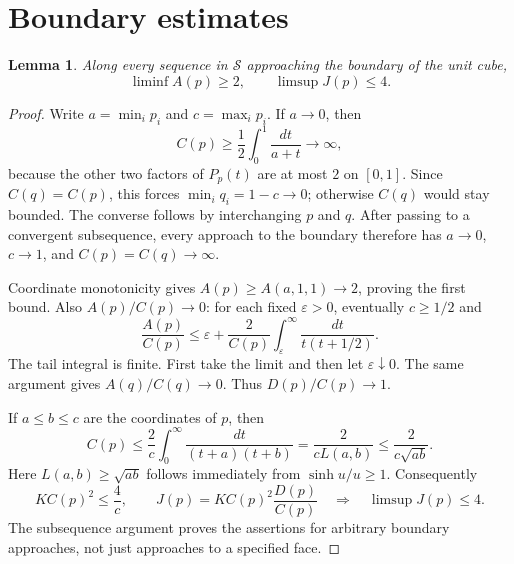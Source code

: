 \documentclass[11pt]{article}
\newtheorem{lemma}{Lemma}
\begin{document}
\section{Boundary estimates}
\begin{lemma}\label{boundary}
Along every sequence in $\mathcal S$ approaching the boundary of the unit cube,
\[
 \liminf A(p)\geq2,\qquad \limsup J(p)\leq4.
\]
\end{lemma}
\begin{proof}
Write $a=\min_i p_i$ and $c=\max_i p_i$. If $a\to0$, then
\[
 C(p)\geq\frac12\int_0^1\frac{dt}{a+t}\longrightarrow\infty,
\]
because the other two factors of $P_p(t)$ are at most $2$ on $[0,1]$.
Since $C(q)=C(p)$, this forces $\min_i q_i=1-c\to0$; otherwise $C(q)$
would stay bounded. The converse follows by interchanging $p$ and $q$.
After passing to a convergent subsequence, every approach to the boundary
therefore has $a\to0$, $c\to1$, and $C(p)=C(q)\to\infty$.

Coordinate monotonicity gives $A(p)\geq A(a,1,1)\to2$, proving the first
bound. Also $A(p)/C(p)\to0$: for each fixed $\varepsilon>0$, eventually
$c\geq1/2$ and
\[
 \frac{A(p)}{C(p)}\leq\varepsilon+
 \frac{2}{C(p)}\int_\varepsilon^\infty\frac{dt}{t(t+1/2)}.
\]
The tail integral is finite. First take the limit and then let
$\varepsilon\downarrow0$. The same argument gives $A(q)/C(q)\to0$.
Thus $D(p)/C(p)\to1$.

If $a\leq b\leq c$ are the coordinates of $p$, then
\[
 C(p)\leq\frac2c\int_0^\infty\frac{dt}{(t+a)(t+b)}
 =\frac{2}{c L(a,b)}\leq\frac{2}{c\sqrt{ab}}.
\]
Here $L(a,b)\geq\sqrt{ab}$ follows immediately from
$\sinh u/u\geq1$. Consequently
\[
 K C(p)^2\leq\frac4c,
 \qquad J(p)=K C(p)^2\frac{D(p)}{C(p)}
 \quad\Longrightarrow\quad\limsup J(p)\leq4.
\]
The subsequence argument proves the assertions for arbitrary boundary
approaches, not just approaches to a specified face.
\end{proof}
\end{document}

